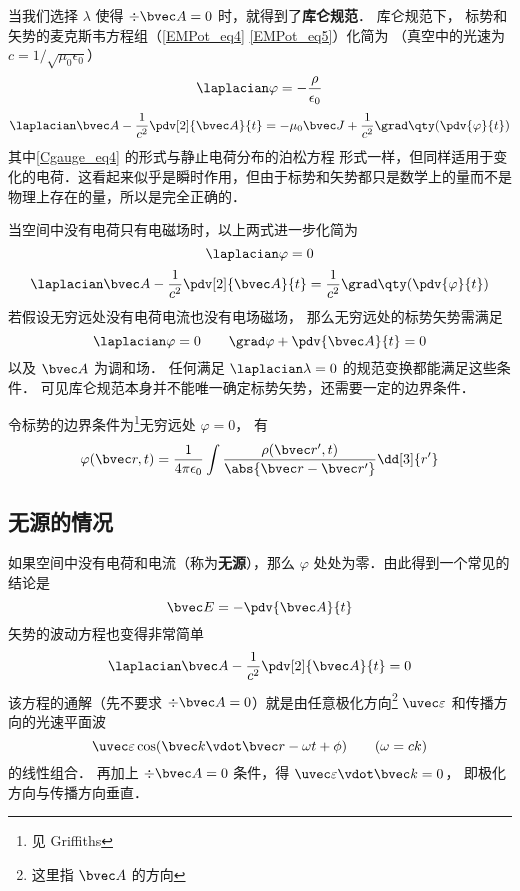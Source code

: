 

当我们选择 $\lambda$ 使得 $\div \bvec A = 0$ 时，就得到了\textbf{库仑规范}． 库仑规范下， 标势和矢势的麦克斯韦方程组（\autoref{EMPot_eq4} \autoref{EMPot_eq5}）化简为 （真空中的光速为 $c = 1/\sqrt{\mu_0\epsilon_0}$）%
\begin{equation}\label{Cgauge_eq4}
\laplacian \varphi = -\frac{\rho}{\epsilon_0}
\end{equation}
\begin{equation}
\laplacian \bvec A - \frac{1}{c^2} \pdv[2]{\bvec A}{t} = -\mu_0\bvec J + \frac{1}{c^2} \grad\qty(\pdv{\varphi}{t})
\end{equation}
其中\autoref{Cgauge_eq4} 的形式与静止电荷分布的泊松方程%
形式一样，但同样适用于变化的电荷．这看起来似乎是瞬时作用，但由于标势和矢势都只是数学上的量而不是物理上存在的量，所以是完全正确的．

当空间中没有电荷只有电磁场时，以上两式进一步化简为
\begin{equation}
\laplacian \varphi = 0
\end{equation}
\begin{equation}
\laplacian \bvec A - \frac{1}{c^2}\pdv[2]{\bvec A}{t} = \frac{1}{c^2} \grad\qty(\pdv{\varphi}{t})
\end{equation}
若假设无穷远处没有电荷电流也没有电场磁场， 那么无穷远处的标势矢势需满足
\begin{equation}
\laplacian \varphi = 0 \qquad
\grad \varphi + \pdv{\bvec A}{t} = 0
\end{equation}
以及 $\bvec A$ 为调和场． 任何满足 $\laplacian \lambda = 0$ 的规范变换都能满足这些条件． 可见库仑规范本身并不能唯一确定标势矢势，还需要一定的边界条件．

令标势的边界条件为\footnote{见 Griffiths}无穷远处 $\varphi = 0$， 有
\begin{equation}
\varphi(\bvec r, t) = \frac{1}{4\pi\epsilon_0} \int \frac{\rho(\bvec r', t)}{\abs{\bvec r - \bvec r'}} \dd[3]{r'}
\end{equation}

\subsection{无源的情况}

如果空间中没有电荷和电流（称为\textbf{无源}），那么 $\varphi$ 处处为零．由此得到一个常见的结论是
\begin{equation}
\bvec E = - \pdv{\bvec A}{t}
\end{equation}
矢势的波动方程也变得非常简单
\begin{equation}
\laplacian \bvec A - \frac{1}{c^2} \pdv[2]{\bvec A}{t} = 0
\end{equation}
该方程的通解（先不要求 $\div \bvec A = 0$）就是由任意极化方向\footnote{这里指 $\bvec A$ 的方向} $\uvec \varepsilon$ 和传播方向的光速平面波
\begin{equation}
\uvec \varepsilon \cos(\bvec k \vdot \bvec r - \omega t + \phi) \qquad (\omega = ck)
\end{equation}
的线性组合． 再加上 $\div \bvec A = 0$ 条件，得 $\uvec \varepsilon \vdot \bvec k = 0$， 即极化方向与传播方向垂直．
